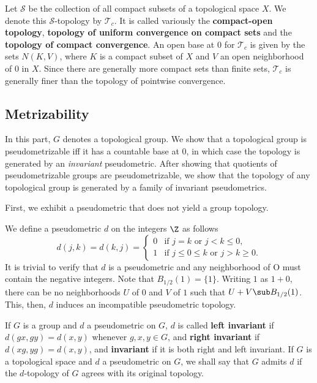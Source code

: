 \begin{example}
Let $\mathcal{S}$ be the collection of all compact subsets of a topological space $X$. We denote this $\mathcal{S}$-topology by $\mathcal{T}_{c}$. It is called variously the \textbf{compact-open topology}, \textbf{topology of uniform convergence on compact sets} and the \textbf{topology of compact convergence}. An open base at $0$ for $\mathcal{T}_c$ is given by the sets $N(K,V)$, where $K$ is a compact subset of $X$ and $V$ an open neighborhood of $0$ in $X$. Since there are generally more compact sets than finite sets, $\mathcal{T}_c$ is generally finer than the topology of pointwise convergence.
\end{example}
\subsection{Metrizability}
In this part, $G$ denotes a topological group. We show that a topological group is pseudometrizable iff it has a countable base at $0$, in which case the topology is generated by an \textit{invariant} pseudometric. After showing that quotients of pseudometrizable groups are pseudometrizable, we show that the topology of any topological group is generated by a family of invariant pseudometrics.\par
First, we exhibit a pseudometric that does not yield a group topology.
\begin{example}
We define a pseudometric $d$ on the integers $\Z$ as follows
\[d(j,k)=d(k,j)=\begin{cases}
0&\text{if $j=k$ or $j<k\leq 0$},\\
1&\text{if $j\leq 0\leq k$ or $j>k\geq 0$}.
\end{cases}\]
It is trivial to verify that $d$ is a pseudometric and any neighborhood of O must contain the negative integers. Note that $B_{1/2}(1)=\{1\}$. Writing $1$ as $1+0$, there can be no neighborhoods $U$ of $0$ and $V$ of $1$ such that $U+V\sub B_{1/2}(1)$. This, then, $d$ induces an incompatible pseudometric topology.
\end{example}
If $G$ is a group and $d$ a pseudometric on $G$, $d$ is called \textbf{left invariant} if $d(gx,gy)=d(x,y)$ whenever $g,x,y\in G$, and \textbf{right invariant} if $d(xg,yg)=d(x,y)$, and \textbf{invariant} if it is both right and left invariant. If $G$ is a topological space and $d$ a pseudometric on $G$, we shall say that $G$ admits $d$ if the $d$-topology of $G$ agrees with its original topology.\par
